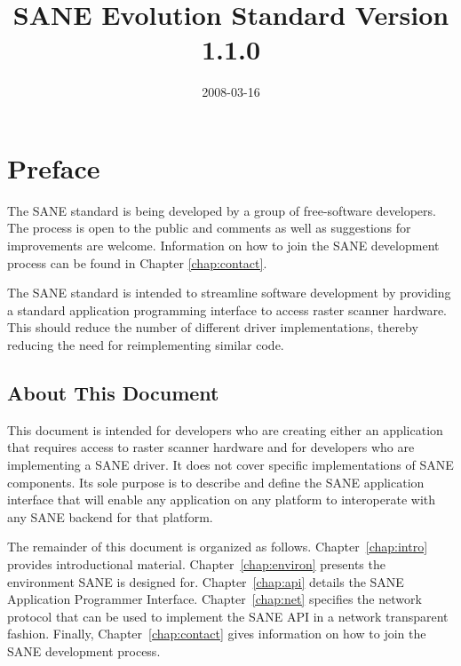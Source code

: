 \documentclass[11pt,DVIps]{report}
\title{\huge SANE Evolution Standard Version 1.1.0}
\author{}
\date{2008-03-16}
\begin{document}
\newcommand{\filename}[1]{{\tt #1}}
\newcommand{\code}[1]{{\tt #1}}
\newcommand{\var}[1]{{\it #1}}
\newcommand{\defn}[1]{#1\index{#1}}

\begin{latexonly}
  \setcounter{changebargrey}{0}   %
\end{latexonly}

\maketitle
\tableofcontents
\listoffigures
\listoftables


\chapter{Preface}

The SANE standard is being developed by a group of free-software
developers.  The process is open to the public and comments as well as
suggestions for improvements are welcome.  Information on how to join
the SANE development process can be found in Chapter
\ref{chap:contact}.

The SANE standard is intended to streamline software development by
providing a standard application programming interface to access
raster scanner hardware.  This should reduce the number of different
driver implementations, thereby reducing the need for reimplementing
similar code.


\section{About This Document}

This document is intended for developers who are creating either an
application that requires access to raster scanner hardware and for
developers who are implementing a SANE driver.  It does not cover
specific implementations of SANE components.  Its sole purpose is to
describe and define the SANE application interface that will enable
any application on any platform to interoperate with any SANE backend
for that platform.

The remainder of this document is organized as follows.
Chapter~\ref{chap:intro} provides introductional material.
Chapter~\ref{chap:environ} presents the environment SANE is designed
for.  Chapter~\ref{chap:api} details the SANE Application Programmer
Interface.  Chapter~\ref{chap:net} specifies the network protocol that
can be used to implement the SANE API in a network transparent
fashion.  Finally, Chapter~\ref{chap:contact} gives information on how
to join the SANE development process.
\end{document}
